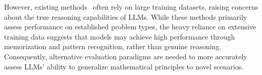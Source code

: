 However, existing methods~\citep{mathbenchmark, Qwen2} often rely on large training datasets, raising concerns about the true reasoning capabilities of LLMs. While these methods primarily assess performance on established problem types, the heavy reliance on extensive training data suggests that models may achieve high performance through memorization and pattern recognition, rather than genuine reasoning. Consequently, alternative evaluation paradigms are needed to more accurately assess LLMs' ability to generalize mathematical principles to novel scenarios.
